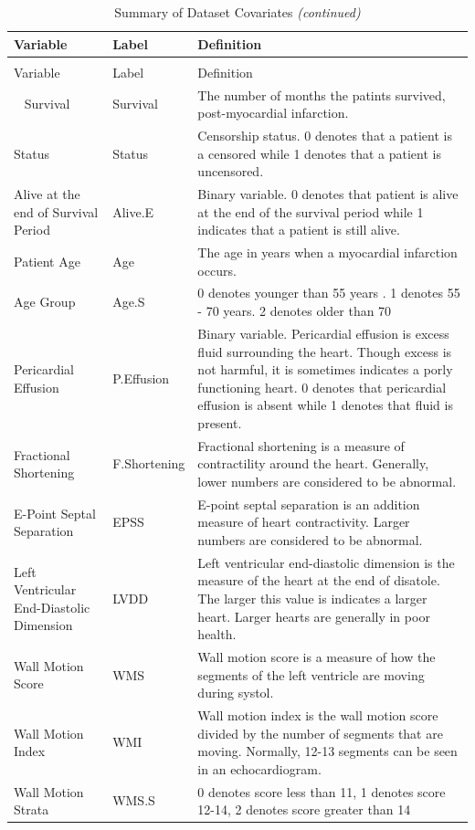 \documentclass[
]{article}
\begin{document}
\begin{longtabu} to 
\caption{\label{tab:Dataset.summary}Summary of Dataset Covariates}\\
\toprule
Variable & Label & Definition\\
\midrule
\endfirsthead
\caption[]{Summary of Dataset Covariates \textit{(continued)}}\\
\toprule
Variable & Label & Definition\\
\midrule
\endhead
\
\endfoot
\bottomrule
\endlastfoot
Survival & Survival & The number of months the patints survived, post-myocardial infarction.\\
\addlinespace
Status & Status & Censorship status. 0 denotes that a patient is a censored while 1 denotes that a patient is uncensored.\\
\addlinespace
Alive at the end of Survival Period & Alive.E & Binary variable. 0 denotes that patient is alive at the end of the survival period while 1 indicates that a patient is still alive.\\
\addlinespace
Patient Age & Age & The age in years when a myocardial infarction occurs.\\
\addlinespace
Age Group & Age.S & 0 denotes younger than 55 years . 1 denotes 55 - 70 years. 2 denotes older than 70\\
\addlinespace
Pericardial Effusion & P.Effusion & Binary variable. Pericardial effusion is excess fluid surrounding the heart. Though excess is not harmful, it is sometimes indicates a porly functioning heart. 0 denotes that pericardial effusion is absent while 1 denotes that fluid is present.\\
\addlinespace
Fractional Shortening & F.Shortening & Fractional shortening is a measure of contractility around the heart. Generally, lower numbers are considered to be abnormal.\\
\addlinespace
E-Point Septal Separation & EPSS & E-point septal separation is an addition measure of heart contractivity. Larger numbers are considered to be abnormal.\\
\addlinespace
Left Ventricular End-Diastolic Dimension & LVDD & Left ventricular end-diastolic dimension is the measure of the heart at the end of disatole. The larger this value is indicates a larger heart. Larger hearts are generally in poor health.\\
\addlinespace
Wall Motion Score & WMS & Wall motion score is a measure of how the segments of the left ventricle are moving during systol.\\
\addlinespace
Wall Motion Index & WMI & Wall motion index is the wall motion score divided by the number of segments that are moving. Normally, 12-13 segments can be seen in an echocardiogram.\\
\addlinespace
Wall Motion Strata & WMS.S & 0 denotes score less than 11, 1 denotes score 12-14, 2 denotes score greater than 14\\*
\end{longtabu}
\end{document}
